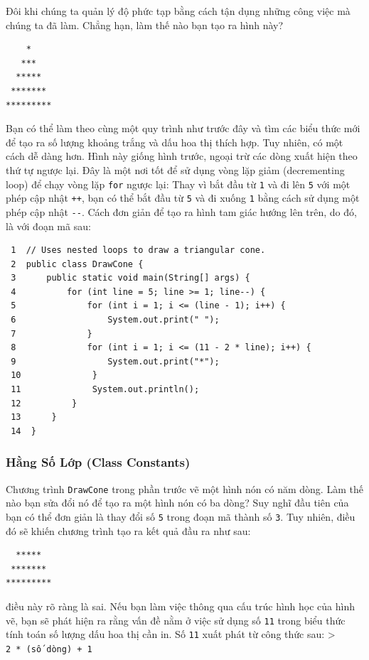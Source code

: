 Đôi khi chúng ta quản lý độ phức tạp bằng cách tận dụng những công việc
mà chúng ta đã làm. Chẳng hạn, làm thế nào bạn tạo ra hình này?

\begin{verbatim}
    * 
   *** 
  ***** 
 ******* 
*********
\end{verbatim}

Bạn có thể làm theo cùng một quy trình như trước đây và tìm các biểu
thức mới để tạo ra số lượng khoảng trắng và dấu hoa thị thích hợp. Tuy
nhiên, có một cách dễ dàng hơn. Hình này giống hình trước, ngoại trừ các
dòng xuất hiện theo thứ tự ngược lại. Đây là một nơi tốt để sử dụng vòng
lặp giảm (decrementing loop) để chạy vòng lặp \texttt{for} ngược lại:
Thay vì bắt đầu từ \texttt{1} và đi lên \texttt{5} với một phép cập nhật
\texttt{++}, bạn có thể bắt đầu từ \texttt{5} và đi xuống \texttt{1}
bằng cách sử dụng một phép cập nhật \texttt{-\/-}. Cách đơn giản để tạo
ra hình tam giác hướng lên trên, do đó, là với đoạn mã sau:

\begin{verbatim}
 1  // Uses nested loops to draw a triangular cone.
 2  public class DrawCone {
 3      public static void main(String[] args) {
 4          for (int line = 5; line >= 1; line--) {
 5              for (int i = 1; i <= (line - 1); i++) {
 6                  System.out.print(" ");
 7              }
 8              for (int i = 1; i <= (11 - 2 * line); i++) {
 9                  System.out.print("*");
 10              }
 11              System.out.println();
 12          }
 13      }
 14  }
\end{verbatim}

\subsubsection{Hằng Số Lớp (Class
Constants)}\label{hux1eb1ng-sux1ed1-lux1edbp-class-constants}

Chương trình \texttt{DrawCone} trong phần trước vẽ một hình nón có năm
dòng. Làm thế nào bạn sửa đổi nó để tạo ra một hình nón có ba dòng? Suy
nghĩ đầu tiên của bạn có thể đơn giản là thay đổi số \texttt{5} trong
đoạn mã thành số \texttt{3}. Tuy nhiên, điều đó sẽ khiến chương trình
tạo ra kết quả đầu ra như sau:

\begin{verbatim}
  ***** 
 ******* 
*********
\end{verbatim}

điều này rõ ràng là sai. Nếu bạn làm việc thông qua cấu trúc hình học
của hình vẽ, bạn sẽ phát hiện ra rằng vấn đề nằm ở việc sử dụng số
\texttt{11} trong biểu thức tính toán số lượng dấu hoa thị cần in. Số
\texttt{11} xuất phát từ công thức sau: \textgreater{}
\texttt{2\ *\ (số\ dòng)\ +\ 1}

